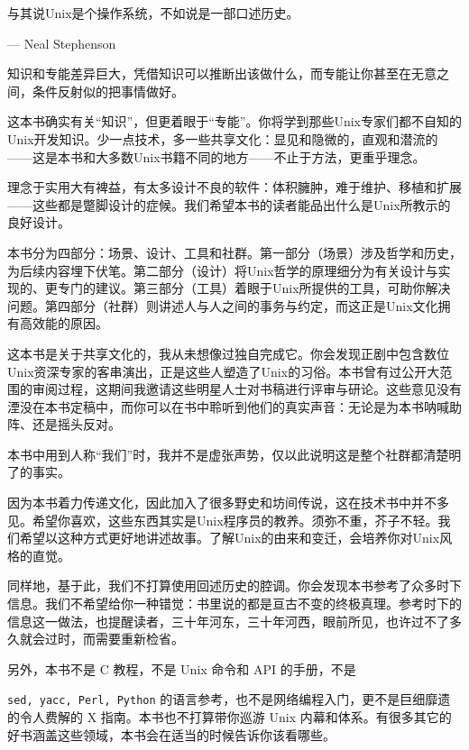 \documentclass[12pt,oneside]{ctexbook}
\begin{document}
\begin{common-format}
\begin{flushright}
\begin{notecard}{23em}

与其说Unix是个操作系统，不如说是一部口述历史。

{\hfill — Neal Stephenson}
\end{notecard}
\end{flushright}

知识和专能差异巨大，凭借知识可以推断出该做什么，而专能让你甚至在无意之间，条件反射似的把事情做好。

这本书确实有关“知识”，但更着眼于“专能”。你将学到那些Unix专家们都不自知的Unix开发知识。少一点技术，多一些共享文化：显见和隐微的，直观和潜流的——这是本书和大多数Unix书籍不同的地方——不止于方法，更重乎理念。

理念于实用大有裨益，有太多设计不良的软件：体积臃肿，难于维护、移植和扩展——这些都是蹩脚设计的症候。我们希望本书的读者能品出什么是Unix所教示的良好设计。

本书分为四部分：场景、设计、工具和社群。第一部分（场景）涉及哲学和历史，为后续内容埋下伏笔。第二部分（设计）将Unix哲学的原理细分为有关设计与实现的、更专门的建议。第三部分（工具）着眼于Unix所提供的工具，可助你解决问题。第四部分（社群）则讲述人与人之间的事务与约定，而这正是Unix文化拥有高效能的原因。

这本书是关于共享文化的，我从未想像过独自完成它。你会发现正剧中包含数位Unix资深专家的客串演出，正是这些人塑造了Unix的习俗。本书曾有过公开大范围的审阅过程，这期间我邀请这些明星人士对书稿进行评审与研论。这些意见没有湮没在本书定稿中，而你可以在书中聆听到他们的真实声音：无论是为本书呐喊助阵、还是摇头反对。

本书中用到人称“我们”时，我并不是虚张声势，仅以此说明这是整个社群都清楚明了的事实。

因为本书着力传递文化，因此加入了很多野史和坊间传说，这在技术书中并不多见。希望你喜欢，这些东西其实是Unix程序员的教养。须弥不重，芥子不轻。我们希望以这种方式更好地讲述故事。了解Unix的由来和变迁，会培养你对Unix风格的直觉。

同样地，基于此，我们不打算使用回述历史的腔调。你会发现本书参考了众多时下信息。我们不希望给你一种错觉：书里说的都是亘古不变的终极真理。参考时下的信息这一做法，也提醒读者，三十年河东，三十年河西，眼前所见，也许过不了多久就会过时，而需要重新检省。

另外，本书不是 C 教程，不是 Unix 命令和 API 的手册，不是 {\texttt{sed, yacc, Perl, Python} 的语言参考，也不是网络编程入门，更不是巨细靡遗的令人费解的 X 指南。本书也不打算带你巡游 Unix 内幕和体系。有很多其它的好书涵盖这些领域，本书会在适当的时候告诉你该看哪些。

}
\end{common-format}
\end{document}
